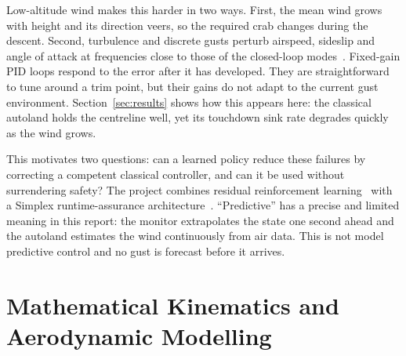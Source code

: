 \documentclass[10pt,a4paper]{article}
\begin{document}
Low-altitude wind makes this harder in two ways. First, the mean wind grows with
height and its direction veers, so the required crab changes during the descent.
Second, turbulence and discrete gusts perturb airspeed, sideslip and angle of
attack at frequencies close to those of the closed-loop modes~\cite{milf8785c}.
Fixed-gain PID loops respond to the error after it has developed. They are
straightforward to tune around a trim point, but their gains do not adapt to the
current gust environment. Section~\ref{sec:results} shows how this appears here:
the classical autoland holds the centreline well, yet its touchdown sink rate
degrades quickly as the wind grows.

This motivates two questions: can a learned policy reduce these failures by
correcting a competent classical controller, and can it be used without
surrendering safety? The project combines residual reinforcement
learning~\cite{silver2018residual,johannink2019residual} with a Simplex
runtime-assurance architecture~\cite{sha2001simplex}. ``Predictive'' has a precise
and limited meaning in this report: the monitor extrapolates the state one second
ahead and the autoland estimates the wind continuously from air data. This is not
model predictive control and no gust is forecast before it arrives.

\section{Mathematical Kinematics and Aerodynamic Modelling}
\end{document}
